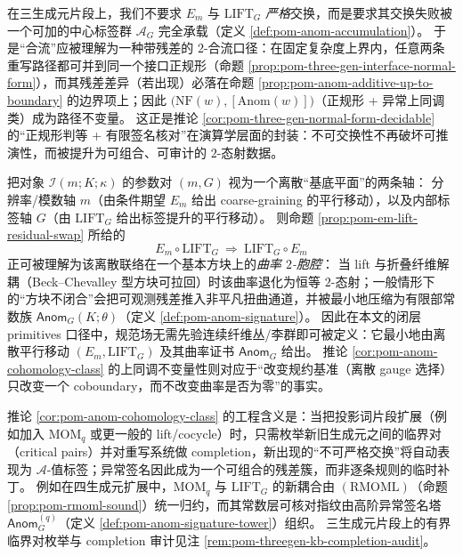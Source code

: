 \begin{remark}\label{rem:pom-residual-2confluence}
在三生成元片段上，我们不要求 \(E_m\) 与 \(\mathrm{LIFT}_G\) \emph{严格}交换，而是要求其交换失败被一个可加的中心标签群 \(\mathcal{A}_G\) 完全承载（定义 \ref{def:pom-anom-accumulation}）。
于是“合流”应被理解为一种带残差的 \(2\)-合流口径：在固定复杂度上界内，任意两条重写路径都可并到同一个接口正规形（命题 \ref{prop:pom-three-gen-interface-normal-form}），而其残差差异（若出现）必落在命题 \ref{prop:pom-anom-additive-up-to-boundary} 的边界项上；因此 \(\bigl(\mathrm{NF}(w),[\mathrm{Anom}(w)]\bigr)\)（正规形 + 异常上同调类）成为路径不变量。
这正是推论 \ref{cor:pom-three-gen-normal-form-decidable} 的“正规形判等 + 有限签名核对”在演算学层面的封装：不可交换性不再破坏可推演性，而被提升为可组合、可审计的 \(2\)-态射数据。
\end{remark}

\begin{remark}\label{rem:pom-anom-as-curvature}
把对象 \(\mathcal{I}(m;K;\kappa)\) 的参数对 \((m,G)\) 视为一个离散“基底平面”的两条轴：
分辨率/模数轴 \(m\)（由条件期望 \(E_m\) 给出 coarse-graining 的平行移动），以及内部标签轴 \(G\)（由 \(\mathrm{LIFT}_G\) 给出标签提升的平行移动）。
则命题 \ref{prop:pom-em-lift-residual-swap} 所给的
\[
E_m\circ \mathrm{LIFT}_G\ \Rightarrow\ \mathrm{LIFT}_G\circ E_m
\]
正可被理解为该离散联络在一个基本方块上的\emph{曲率 \(2\)-胞腔}：
当 lift 与折叠纤维解耦（Beck--Chevalley 型方块可拉回）时该曲率退化为恒等 \(2\)-态射；一般情形下的“方块不闭合”会把可观测残差推入非平凡扭曲通道，并被最小地压缩为有限部常数族 \(\mathsf{Anom}_G(K;\theta)\)（定义 \ref{def:pom-anom-signature}）。
因此在本文的闭层 primitives 口径中，规范场无需先验连续纤维丛/李群即可被定义：它最小地由离散平行移动 \((E_m,\mathrm{LIFT}_G)\) 及其曲率证书 \(\mathsf{Anom}_G\) 给出。
推论 \ref{cor:pom-anom-cohomology-class} 的上同调不变量性则对应于“改变规约基准（离散 gauge 选择）只改变一个 coboundary，而不改变曲率是否为零”的事实。
\end{remark}

\begin{remark}\label{rem:pom-anom-completion}
推论 \ref{cor:pom-anom-cohomology-class} 的工程含义是：当把投影词片段扩展（例如加入 \(\mathrm{MOM}_q\) 或更一般的 lift/cocycle）时，只需枚举新旧生成元之间的临界对（critical pairs）并对重写系统做 completion，新出现的“不可严格交换”将自动表现为 \(\mathcal{A}\)-值标签；异常签名因此成为一个可组合的残差簇，而非逐条规则的临时补丁。
例如在四生成元扩展中，\(\mathrm{MOM}_q\) 与 \(\mathrm{LIFT}_G\) 的新耦合由 \((\mathrm{RMOML})\)（命题 \ref{prop:pom-rmoml-sound}）统一归约，而其常数层可核对指纹由高阶异常签名塔 \(\mathsf{Anom}^{(q)}_G\)（定义 \ref{def:pom-anom-signature-tower}）组织。
三生成元片段上的有界临界对枚举与 completion 审计见注 \ref{rem:pom-threegen-kb-completion-audit}。
\end{remark}

